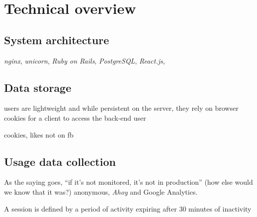 
\chapter{Technical overview}

\section{System architecture}

\emph{nginx}, \emph{unicorn}, \emph{Ruby on Rails}, \emph{PostgreSQL}, \emph{React.js}, 

\section{Data storage}

users are lightweight and while persistent on the server, they rely on browser cookies for a client to access the back-end user

cookies, likes not on fb

\section{Usage data collection}

As the saying goes, ``if it's not monitored, it's not in production'' \cite{monitored} (how else would we know that it was?) anonymous, \emph{Ahoy} and Google Analytics.

A session is defined by a period of activity expiring after 30 minutes of inactivity